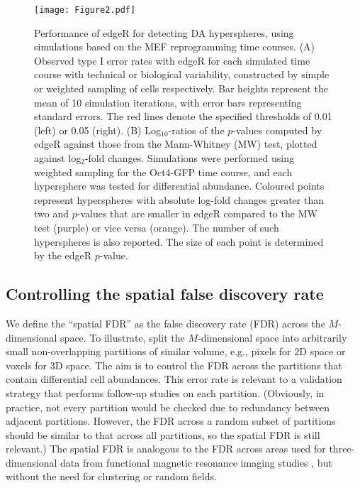 \documentclass{article}
\begin{document}
\begin{figure}[bt]
    \begin{center}
        \texttt{[image: Figure2.pdf]}
    \end{center}
\caption{
Performance of edgeR for detecting DA hyperspheres, using simulations based on the MEF reprogramming time courses.
(A) Observed type I error rates with edgeR for each simulated time course with technical or biological variability, constructed by simple or weighted sampling of cells respectively.
Bar heights represent the mean of 10 simulation iterations, with error bars representing standard errors.
The red lines denote the specified thresholds of 0.01 (left) or 0.05 (right).
(B) Log$_{10}$-ratios of the $p$-values computed by edgeR against those from the Mann-Whitney (MW) test, plotted against log$_{2}$-fold changes.
Simulations were performed using weighted sampling for the Oct4-GFP time course, and each hypersphere was tested for differential abundance.
Coloured points represent hyperspheres with absolute log-fold changes greater than two and $p$-values that are smaller in edgeR compared to the MW test (purple) or vice versa (orange).
The number of such hyperspheres is also reported.
The size of each point is determined by the edgeR $p$-value.
}
\label{fig:testtest}
\end{figure}

\subsection{Controlling the spatial false discovery rate}
We define the ``spatial FDR'' as the false discovery rate (FDR) across the $M$-dimensional space.
To illustrate, split the $M$-dimensional space into arbitrarily small non-overlapping partitions of similar volume, e.g., pixels for 2D space or voxels for 3D space.
The aim is to control the FDR across the partitions that contain differential cell abundances.
This error rate is relevant to a validation strategy that performs follow-up studies on each partition. 
(Obviously, in practice, not every partition would be checked due to redundancy between adjacent partitions.
However, the FDR across a random subset of partitions should be similar to that across all partitions, so the spatial FDR is still relevant.)
The spatial FDR is analogous to the FDR across areas used for three-dimensional data from functional magnetic resonance imaging studies \cite{pacifico2004false,benjamini2007false}, but without the need for clustering or random fields.
\end{document}
